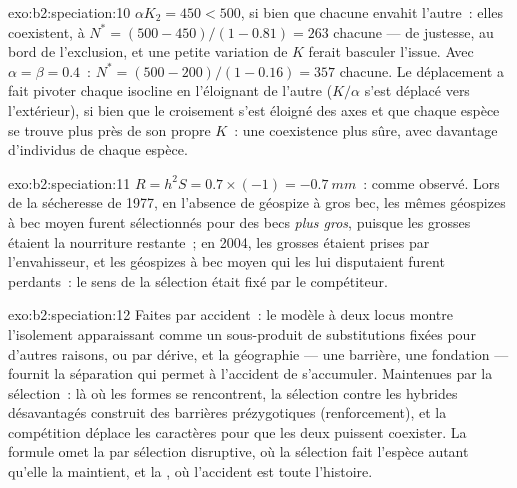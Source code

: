 \begin{solution}{exo:b2:speciation:10}
$\alpha K_2 = 450 < 500$, si bien que chacune envahit l'autre~: elles
coexistent, à $N^{*} = (500 - 450)/(1 - 0.81) = 263$ chacune --- de
justesse, au bord de l'exclusion, et une petite variation de $K$ ferait
basculer l'issue. Avec
$\alpha = \beta = 0.4$~: $N^{*} = (500 - 200)/(1 - 0.16) = 357$ chacune.
Le déplacement a fait pivoter chaque isocline en l'éloignant de l'autre
($K/\alpha$ s'est déplacé vers l'extérieur), si bien que le croisement
s'est éloigné des axes et que chaque espèce se trouve plus près de son
propre $K$~: une coexistence plus sûre, avec davantage d'individus de
chaque espèce.
\end{solution}

\begin{solution}{exo:b2:speciation:11}
$R = h^{2}S = 0.7\times(-1) = \qty{-0.7}{mm}$~: comme observé. Lors de la
sécheresse de 1977, en l'absence de géospize à gros bec, les mêmes
géospizes à bec moyen furent sélectionnés pour des becs \emph{plus gros},
puisque les grosses  étaient la nourriture restante~; en 2004, les
grosses  étaient prises par l'envahisseur, et les géospizes à bec
moyen qui les lui disputaient furent perdants~: le sens de la sélection
était fixé par le compétiteur.
\end{solution}

\begin{solution}{exo:b2:speciation:12}
Faites par accident~: le modèle à deux locus montre l'isolement
apparaissant comme un sous-produit de substitutions fixées pour d'autres
raisons, ou par dérive, et la géographie --- une barrière, une fondation
--- fournit la séparation qui permet à l'accident de s'accumuler.
Maintenues par la sélection~: là où les formes se rencontrent, la
sélection contre les hybrides désavantagés construit des barrières
prézygotiques (renforcement), et la compétition déplace les caractères
pour que les deux puissent coexister. La formule omet la  par sélection disruptive, où la sélection fait l'espèce
autant qu'elle la maintient, et la , où l'accident est toute
l'histoire.
\end{solution}

